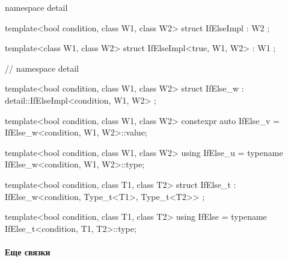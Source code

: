 \begin{cppcode}
namespace detail {

template<bool condition, class W1, class W2>
struct IfElseImpl : W2 {};

template<class W1, class W2>
struct IfElseImpl<true, W1, W2> : W1 {};
} // namespace detail

template<bool condition, class W1, class W2>
struct IfElse_w : detail::IfElseImpl<condition, W1, W2> {};

template<bool condition, class W1, class W2>
constexpr auto IfElse_v = IfElse_w<condition, W1, W2>::value;

template<bool condition, class W1, class W2>
using IfElse_u = typename IfElse_w<condition, W1, W2>::type;

template<bool condition, class T1, class T2>
struct IfElse_t : IfElse_w<condition, Type_t<T1>, Type_t<T2>> {};

template<bool condition, class T1, class T2>
using IfElse = typename IfElse_t<condition, T1, T2>::type;
\end{cppcode}

\paragraph{Еще связки}

